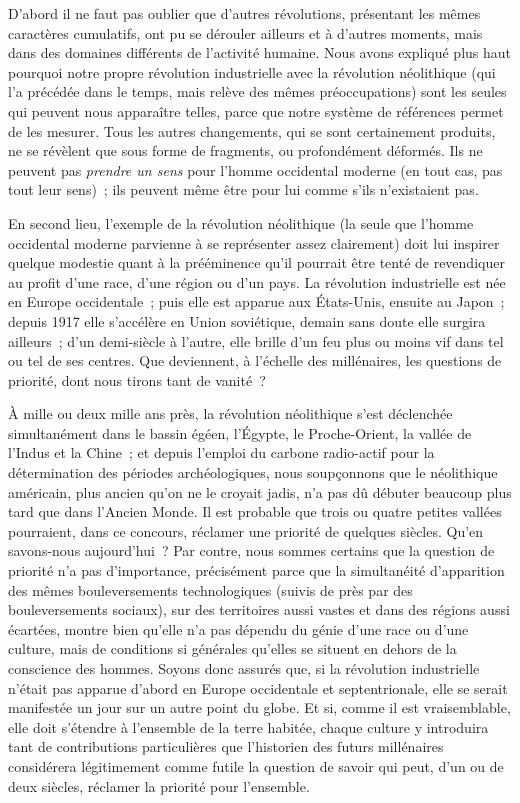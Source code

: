 \documentclass[french,twoside]{book} %
\begin{document}
D’abord il ne faut pas oublier que d’autres révolutions, présentant les mêmes caractères cumulatifs, ont pu se dérouler ailleurs et à d’autres moments, mais dans des domaines différents de l’activité humaine. Nous avons expliqué plus haut pourquoi notre propre révolution industrielle avec la révolution néolithique (qui l’a précédée dans le temps, mais relève des mêmes préoccupations) sont les seules qui peuvent nous apparaître telles, parce que notre système de références permet de les mesurer. Tous les autres changements, qui se sont certainement produits, ne se révèlent que sous forme de fragments, ou profondément déformés. Ils ne peuvent pas \emph{prendre un sens} pour l’homme occidental moderne (en tout cas, pas tout leur sens) ; ils peuvent même être pour lui comme s’ils n’existaient pas.\par
En second lieu, l’exemple de la révolution néolithique (la seule que l’homme occidental moderne parvienne à se représenter assez clairement) doit lui inspirer quelque modestie quant à la prééminence qu’il pourrait être tenté de revendiquer au profit d’une race, d’une région ou d’un pays. La révolution industrielle est née en Europe occidentale ; puis elle est apparue aux États-Unis, ensuite au Japon ; depuis 1917 elle s’accélère en Union soviétique, demain sans doute elle surgira ailleurs ; d’un demi-siècle à l’autre, elle brille d’un feu plus ou moins vif dans tel ou tel de ses centres. Que deviennent, à l’échelle des millénaires, les questions de priorité, dont nous tirons tant de vanité ?\par
À mille ou deux mille ans près, la révolution néolithique s’est déclenchée simultanément dans le bassin égéen, l’Égypte, le Proche-Orient, la vallée de l’Indus et la Chine ; et depuis l’emploi du carbone radio-actif pour la détermination des périodes archéologiques, nous soupçonnons que le néolithique américain, plus ancien qu’on ne le croyait jadis, n’a pas dû débuter beaucoup plus tard que dans l’Ancien Monde. Il est probable que trois ou quatre petites vallées pourraient, dans ce concours, réclamer une priorité de quelques siècles. Qu’en savons-nous aujourd’hui ? Par contre, nous sommes certains que la question de priorité n’a pas d’importance, précisément parce que la simultanéité d’apparition des mêmes bouleversements technologiques (suivis de près par des bouleversements sociaux), sur des territoires aussi vastes et dans des régions aussi écartées, montre bien qu’elle n’a pas dépendu du génie d’une race ou d’une culture, mais de conditions si générales qu’elles se situent en dehors de la conscience des hommes. Soyons donc assurés que, si la révolution industrielle n’était pas apparue d’abord en Europe occidentale et septentrionale, elle se serait manifestée un jour sur un autre point du globe. Et si, comme il est vraisemblable, elle doit s’étendre à l’ensemble de la terre habitée, chaque culture y introduira tant de contributions particulières que l’historien des futurs millénaires considérera légitimement comme futile la question de savoir qui peut, d’un ou de deux siècles, réclamer la priorité pour l’ensemble.\par
\end{document}
